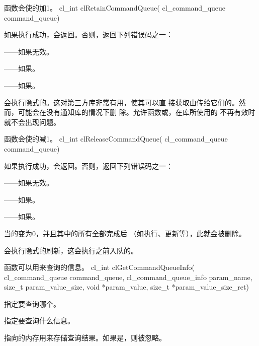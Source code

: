 函数会使的加1。
\startclc
cl_int clRetainCommandQueue(
		cl_command_queue command_queue)
\stopclc

如果执行成功，会返回。否则，返回下列错误码之一：
\startigBase
\item {}——如果无效。
\item {}——如果\scdevfailres。
\item {}——如果\schostfailres。
\stopigBase

会执行隐式的。这对第三方库非常有用，使其可以直
接获取由传给它们的。然而，可能会在没有通知库的情况下删
除。允许函数或，在库所使用的
不再有效时就不会出现问题。

函数会使的减1。
\startclc
cl_int clReleaseCommandQueue(
		cl_command_queue command_queue)
\stopclc

如果执行成功，会返回。否则，返回下列错误码之一：
\startigBase
\item {}——如果无效。
\item {}——如果\scdevfailres。
\item {}——如果\schostfailres。
\stopigBase

当的变为0，并且其中的所有全部完成后
（如执行、更新等），此就会被删除。

会执行隐式的刷新，这会执行之前入队的\scopencl{}。

函数可以用来查询的信息。
\startclc
cl_int clGetCommandQueueInfo(
		cl_command_queue command_queue,
		cl_command_queue_info param_name,
		size_t param_value_size,
		void *param_value,
		size_t *param_value_size_ret)
\stopclc

指定要查询哪个。

指定要查询什么信息。

指向的内存用来存储查询结果。如果是，则被忽略。

